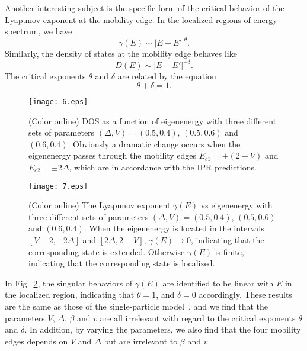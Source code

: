 \documentclass[prb,showpacs,twocolumn,aps,superscriptaddress,a4paper]{revtex4-1}
\begin{document}
Another interesting subject is the specific form of the critical behavior of the Lyapunov exponent at the mobility edge. In the localized regions of energy spectrum, we have
\begin{equation}
\gamma(E) \sim | E- E'|^\theta.
\end{equation}
 Similarly, the density of states at the mobility edge behaves like
\begin{equation}
D(E) \sim | E- E'|^{-\delta}.
\end{equation}
The critical exponents $\theta$ and $\delta$ are related by the equation
\begin{equation}
\theta + \delta =1.
\end{equation}
\begin{figure}
  \centering
  \texttt{[image: 6.eps]}\\
  \caption{(Color online) DOS as a function of eigenenergy with three different sets of parameters $(\Delta,V)=(0.5,0.4)$, $(0.5,0.6)$ and $(0.6,0.4)$. Obviously a dramatic change occurs when the eigenenergy passes through the mobility edges $E_{c1}=\pm (2- V)$ and $E_{c2}=\pm 2\Delta$, which are in accordance with the IPR predictions.  }
  \label{006}
\end{figure}
\begin{figure}
  \centering
  \texttt{[image: 7.eps]}\\
 \caption{(Color online) The Lyapunov exponent $\gamma(E)$ vs eigenenergy with three different sets of parameters $(\Delta,V)=(0.5,0.4)$, $(0.5,0.6)$ and $(0.6,0.4)$. When the eigenenergy is located in the intervals $[V-2, -2\Delta]$ and $[2\Delta, 2 - V]$, $\gamma(E)\rightarrow 0$, indicating that the corresponding state is extended. Otherwise $\gamma(E)$ is finite, indicating that the corresponding state is localized. }
  \label{007}
\end{figure}
In Fig.~\ref{007}, the singular behaviors of $\gamma(E)$ are identified to be linear with $E$ in the localized region, indicating that $\theta=1$, and $\delta=0$ accordingly. These results are the same as those of the single-particle model~\cite{sarma18}, and we find that the parameters $V$, $\Delta$, $\beta$ and $v$ are all irrelevant with regard to the critical exponents $\theta$ and $\delta$. In addition, by varying the parameters, we also find that the four mobility edges depends on $V$ and $\Delta$ but are irrelevant to $\beta$ and $v$.
\end{document}
